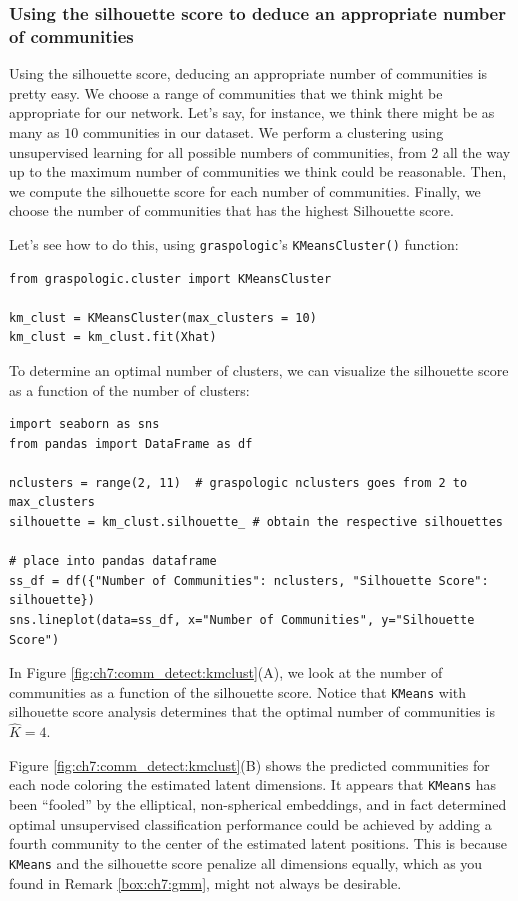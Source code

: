 \subsubsection{Using the silhouette score to deduce an appropriate number of communities}

Using the silhouette score, deducing an appropriate number of communities is pretty easy. We choose a range of communities that we think might be appropriate for our network. Let's say, for instance, we think there might be as many as $10$ communities in our dataset. We perform a clustering using unsupervised learning for all possible numbers of communities, from $2$ all the way up to the maximum number of communities we think could be reasonable. Then, we compute the silhouette score for each number of communities. Finally, we choose the number of communities that has the highest Silhouette score. 

Let's see how to do this, using \texttt{graspologic}'s \texttt{KMeansCluster()} function:

\begin{lstlisting}[style=python]
from graspologic.cluster import KMeansCluster

km_clust = KMeansCluster(max_clusters = 10)
km_clust = km_clust.fit(Xhat)
\end{lstlisting}

To determine an optimal number of clusters, we can visualize the silhouette score as a function of the number of clusters:

\begin{lstlisting}[style=python]
import seaborn as sns
from pandas import DataFrame as df

nclusters = range(2, 11)  # graspologic nclusters goes from 2 to max_clusters
silhouette = km_clust.silhouette_ # obtain the respective silhouettes

# place into pandas dataframe
ss_df = df({"Number of Communities": nclusters, "Silhouette Score": silhouette})
sns.lineplot(data=ss_df, x="Number of Communities", y="Silhouette Score")
\end{lstlisting}

In Figure \ref{fig:ch7:comm_detect:kmclust}(A), we look at the number of communities as a function of the silhouette score. Notice that \texttt{KMeans} with silhouette score analysis determines that the optimal number of communities is $\hat K = 4$. 

Figure \ref{fig:ch7:comm_detect:kmclust}(B) shows the predicted communities for each node coloring the estimated latent dimensions. It appears that \texttt{KMeans} has been ``fooled'' by the elliptical, non-spherical embeddings, and in fact determined optimal unsupervised classification performance could be achieved by adding a fourth community to the center of the estimated latent positions. This is because \texttt{KMeans} and the silhouette score penalize all dimensions equally, which as you found in Remark \ref{box:ch7:gmm}, might not always be desirable. 

